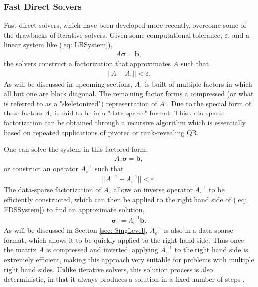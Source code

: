 \documentclass{sfuthesis}
\begin{document}

\subsubsection{Fast Direct Solvers}

Fast direct solvers, which have been developed more recently, overcome some of the drawbacks of iterative solvers. Given some computational tolerance, $\varepsilon$, and a linear system like (\ref{eq: LBSystem}), 
\begin{align}
	A\bm{\sigma}=\mathbf{b}, \label{eq: FDSSystem} 
\end{align}
the solvers construct a factorization that approximates $A$ such that 
\begin{align}
	||A-A_\varepsilon||<\varepsilon.  \label{eq: FDSCompression} 
\end{align}
As will be discussed in upcoming sections, $A_\varepsilon$ is built of multiple factors in which all but one are block diagonal. The remaining factor forms a compressed (or what is referred to as a "skeletonized") representation of $A$ \cite{ChengEtAl2005, MartRokh2005, GillYoungMart2012}. Due to the special form of these factors $A_\varepsilon$ is said to be in a "data-sparse" format. This data-sparse factorization can be obtained through a recursive algorithm which is essentially based on repeated applications of pivoted or rank-revealing QR. 

One can solve the system in this factored form,
\begin{align*}
	A_\varepsilon \bm{\sigma}=\mathbf{b},
\end{align*}
 or construct an operator $A_\varepsilon^{-1}$ such that
\begin{align}
	||A^{-1}-A_{\varepsilon}^{-1}||<\varepsilon. \label{eq: FDSInversion} 
\end{align}
The data-sparse factorization of $A_\varepsilon$ allows an inverse operator $A_\varepsilon^{-1}$ to be efficiently constructed, which can then be applied to the right hand side of (\ref{eq: FDSSystem}) to find an approximate solution,
\begin{align}
	\bm{\sigma}_\varepsilon=A_\varepsilon^{-1}\mathbf{b}. \label{eq: FDSSolution} 
\end{align}
As will be discussed in Section \ref{sec: SingLevel}, $A_\varepsilon^{-1}$ is also in a data-sparse format, which allows it to be quickly applied to the right hand side. Thus once the matrix $A$ is compressed and inverted, applying $A_\varepsilon^{-1}$ to the right hand side is extremely efficient, making this approach very suitable for problems with multiple right hand sides. Unlike iterative solvers, this solution process is also deterministic, in that it always produces a solution in a fixed number of steps \cite{MartRokh2005, GillYoungMart2012, HoGreen2012}.
\end{document}
